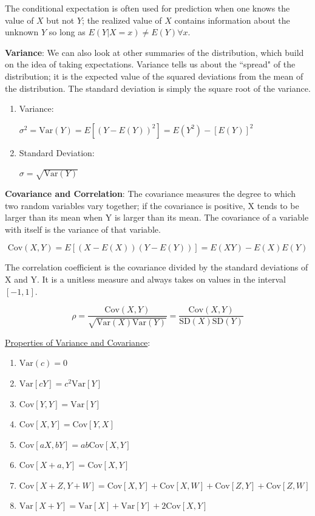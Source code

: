 \documentclass[]{book}
\newcommand{\Var}{\mathrm{Var}}
\newcommand{\SD}{\mathrm{SD}}
\newcommand{\Cov}{\mathrm{Cov}}
\theoremstyle{definition}
\theoremstyle{definition}
\theoremstyle{definition}
\theoremstyle{remark}
\begin{document}
The conditional expectation is often used for prediction when one knows
the value of \(X\) but not \(Y\); the realized value of \(X\) contains
information about the unknown \(Y\) so long as
\(E(Y|X = x) \neq E(Y) \forall x\).

\textbf{Variance}: We can also look at other summaries of the
distribution, which build on the idea of taking expectations. Variance
tells us about the ``spread" of the distribution; it is the expected
value of the squared deviations from the mean of the distribution. The
standard deviation is simply the square root of the variance.

\begin{enumerate}
\item \parbox[t]{1.5in}{Variance:} $\sigma^2= \Var(Y) = E[(Y - E(Y))^2] =  E(Y^2)-[E(Y)]^2$
\item \parbox[t]{1.5in}{Standard Deviation:} $\sigma= \sqrt{\Var(Y)}$
\end{enumerate}

\textbf{Covariance and Correlation}: The covariance measures the degree
to which two random variables vary together; if the covariance is
positive, X tends to be larger than its mean when Y is larger than its
mean. The covariance of a variable with itself is the variance of that
variable.

\[\Cov(X,Y) = E[(X - E(X))(Y - E(Y))] = E(XY) - E(X)E(Y)\]

The correlation coefficient is the covariance divided by the standard
deviations of X and Y. It is a unitless measure and always takes on
values in the interval \([-1,1]\).

\[\rho = \frac{\Cov(X,Y)}{\sqrt{\Var(X)\Var(Y)}} = \frac{\Cov(X,Y)}{\SD(X)\SD(Y)}\]

\underline{Properties of Variance and Covariance}:

\begin{enumerate}
\item $\Var(c) = 0$
\item $\Var[cY] = c^2\Var[Y]$
\item $\Cov[Y,Y] = \Var[Y]$
\item $\Cov[X,Y] = \Cov[Y,X]$
\item $\Cov[aX,bY] = ab\Cov[X,Y]$
\item $\Cov[X+a,Y] = \Cov[X,Y]$
\item $\Cov[X+Z,Y+W] = \Cov[X,Y] + \Cov[X,W] + \Cov[Z,Y] + \Cov[Z,W]$
\item $\Var[X+Y] = \Var[X] + \Var[Y] + 2\Cov[X,Y]$\\
\end{enumerate}
\end{document}

